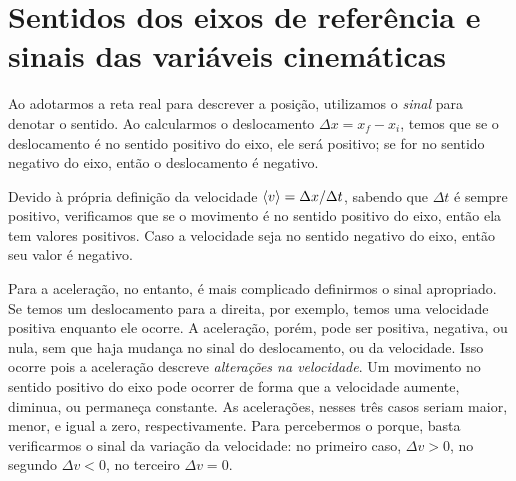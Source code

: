 \section{Sentidos dos eixos de referência e sinais das variáveis cinemáticas}

Ao adotarmos a reta real para descrever a posição, utilizamos o \emph{sinal} para denotar o sentido. Ao calcularmos o deslocamento $\Delta x = x_f - x_i$, temos que se o deslocamento é no sentido positivo do eixo, ele será positivo; se for no sentido negativo do eixo, então o deslocamento é negativo.

Devido à própria definição da velocidade $\left\langle{v}\right\rangle = \Delta x / \Delta t$, sabendo que $\Delta t$ é sempre positivo, verificamos que se o movimento é no sentido positivo do eixo, então ela tem valores positivos. Caso a velocidade seja no sentido negativo do eixo, então seu valor é negativo.

Para a aceleração, no entanto, é mais complicado definirmos o sinal apropriado. Se temos um deslocamento para a direita, por exemplo, temos uma velocidade positiva enquanto ele ocorre. A aceleração, porém, pode ser positiva, negativa, ou nula, sem que haja mudança no sinal do deslocamento, ou da velocidade. Isso ocorre pois a aceleração descreve \emph{alterações na velocidade}. Um movimento no sentido positivo do eixo pode ocorrer de forma que a velocidade aumente, diminua, ou permaneça constante. As acelerações, nesses três casos seriam maior, menor, e igual a zero, respectivamente. Para percebermos o porque, basta verificarmos o sinal da variação da velocidade: no primeiro caso, $\Delta v > 0$, no segundo $\Delta v < 0$, no terceiro $\Delta v = 0$.

